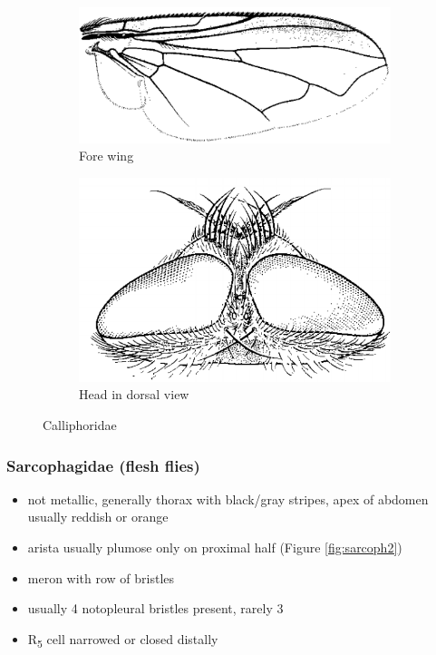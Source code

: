 \documentclass[letterpaper, 11pt]{article}
\begin{document}
\begin{figure}[ht!]
    \centering
    \begin{subfigure}[ht!]{0.5\textwidth}
        \includegraphics[width=\textwidth]{CalliphoridWing}
        \caption{Fore wing \citep[][Fig. 106.6]{mcalpine1981manualv2}}
        \label{fig:calliphorid1}
    \end{subfigure}
    \qquad
    \begin{subfigure}[ht!]{0.3\textwidth}
        \includegraphics[width=\textwidth]{CalliphoridHead}
        \caption{Head in dorsal view \citep[][Fig. 106.18]{mcalpine1981manualv2}}
        \label{fig:calliphorid2}
    \end{subfigure}
    \caption{Calliphoridae}\label{fig:calliphorids}
\end{figure}

\subsubsection{Sarcophagidae (flesh flies)}
\begin{itemize}
\item not metallic, generally thorax with black/gray stripes, apex of abdomen usually reddish or orange
\item arista usually plumose only on proximal half (Figure \ref{fig:sarcoph2})
\item meron with row of bristles
\item usually 4 notopleural bristles present, rarely 3
\item \texorpdfstring{R\textsubscript{5}}{R5} cell narrowed or closed distally
\end{itemize}
\end{document}
